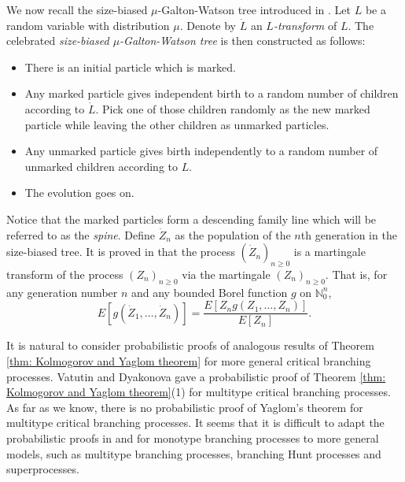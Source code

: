 \documentclass[UTF8]{pkuthss}
\theoremstyle{plain}
\theoremstyle{definition}
\numberwithin{equation}{section}
\begin{document}
We now recall the size-biased $\mu$-Galton-Watson tree introduced in \cite{LyonsPemantlePeres1995Conceptual}.
Let $L$ be a random variable with distribution $\mu$.
Denote by $\dot L$ an \emph{$L$-transform} of $L$.
The celebrated \emph{size-biased $\mu$-Galton-Watson tree} is then constructed as follows:
\begin{itemize}
	\item
	There is an initial particle which is marked.
	\item
	Any marked particle gives independent birth to a random number of children according to $\dot L$. Pick one of those children randomly as the new marked particle while leaving the other children as unmarked particles.
	\item
	Any unmarked particle gives
	birth independently to a random number of unmarked children according to $L$.
	\item
	The evolution goes on.
\end{itemize}

Notice that the marked particles form a descending family line which will be referred to as the \emph{spine}.
Define $\dot Z_n$ as the population of the $n$th generation in the size-biased tree.
It is proved in \cite{LyonsPemantlePeres1995Conceptual} that the process $(\dot Z_n)_{n\ge 0}$ is a martingale transform of the process $(Z_n)_{n\ge 0}$ via the martingale $(Z_n)_{n\ge 0}.$
That is, for any generation number $n$ and any bounded Borel function $g$ on $\mathbb N_0^{n}$,
\begin{equation}
\label{eq:htransformation}
E [ g ( \dot Z_1, \dots, \dot Z_n) ]
= \frac { E[ Z_n g( Z_1, \dots, Z_n)]} {E [ Z_n]}.
\end{equation}

It is natural to consider probabilistic proofs of analogous results of Theorem \ref{thm: Kolmogorov and Yaglom theorem} for more general critical branching processes.
Vatutin and  Dyakonova \cite{VatutinDyakonova2001The-survival} gave a probabilistic proof of Theorem \ref{thm: Kolmogorov and Yaglom theorem}(1) for multitype critical branching processes.
As far as we know, there is no probabilistic proof of Yaglom's theorem for multitype critical branching processes.
It seems that it is difficult to adapt the probabilistic proofs in \cite{Geiger2000A-new} and \cite{LyonsPemantlePeres1995Conceptual} for monotype branching processes to more general models, such as multitype branching processes, branching Hunt processes and superprocesses.
\end{document}
